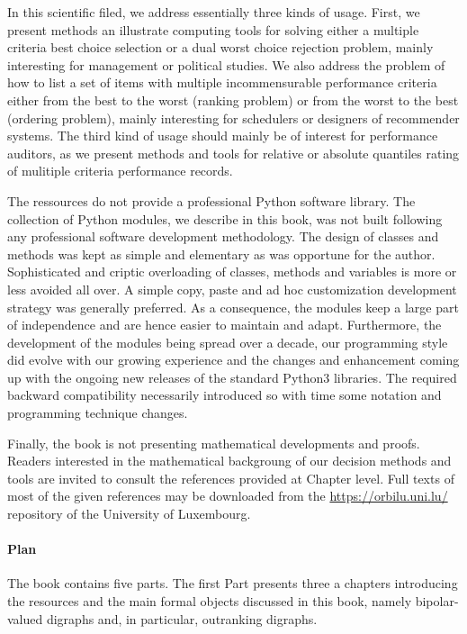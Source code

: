 In this scientific filed, we address essentially three kinds of usage. First, we present methods an illustrate computing tools for solving either a multiple criteria best choice selection or a dual worst choice rejection problem, mainly interesting for management or political studies. We also address the problem of how to list a set of items with multiple incommensurable performance criteria either from the best to the worst (ranking problem) or from the worst to the best (ordering problem), mainly interesting for schedulers or designers of recommender systems. The third kind of usage should mainly be of interest for performance auditors, as we present methods and tools for relative or absolute quantiles rating of mulitiple criteria performance records. 

The \Digraph ressources do not provide a professional Python software library. The collection of Python modules, we describe in this book, was not built following any professional software development methodology. The design of classes and methods was kept as simple and elementary as was opportune for the author. Sophisticated and criptic overloading of classes, methods and variables is more or less avoided all over. A simple copy, paste and ad hoc customization development strategy was generally preferred. As a consequence, the \Digraph modules keep a large part of independence and are hence easier to maintain and adapt.  Furthermore, the development of the \Digraph modules being spread over a decade, our programming style did evolve with our growing experience and the changes and enhancement coming up with the ongoing new releases of the standard Python3 libraries. The required backward compatibility necessarily introduced so with time some notation and programming technique changes.

Finally, the book is not presenting mathematical developments and proofs. Readers interested in the mathematical backgroung of our decision methods and tools are invited to consult the references provided at Chapter level. Full texts of most of the given references may be downloaded from the \href{https://orbilu.uni.lu/}{https://orbilu.uni.lu/} repository of the University of Luxembourg. 

\paragraph{Plan}

\noindent The book contains five parts. The first Part presents three a chapters introducing the \Digraph resources and the main formal objects discussed in this book, namely bipolar-valued digraphs and, in particular, outranking digraphs.


